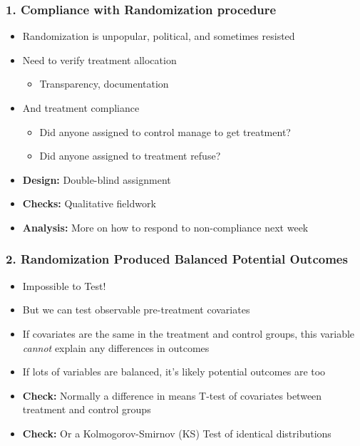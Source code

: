 \documentclass[xcolor=x11names,compress]{beamer}\usepackage[]{graphicx}\usepackage[]{color}
\renewcommand{\(}{\begin{columns}}
\renewcommand{\)}{\end{columns}}
\newcommand{\<}[1]{\begin{column}{#1}}
\renewcommand{\>}{\end{column}}
\begin{document}
\begin{frame}
\frametitle{1. Compliance with Randomization procedure}
\begin{itemize}
\item Randomization is unpopular, political, and sometimes resisted
\pause
\item Need to verify treatment allocation
\begin{itemize}
\item Transparency, documentation
\end{itemize}
\pause
\item And treatment compliance
\begin{itemize}
\item Did anyone assigned to control manage to get treatment?
\item Did anyone assigned to treatment refuse?
\pause
\end{itemize}
\item \textbf{Design:} Double-blind assignment
\pause
\item \textbf{Checks:} Qualitative fieldwork
\pause
\item \textbf{Analysis:} More on how to respond to non-compliance next week
\end{itemize}
\end{frame}

\begin{frame}
\frametitle{2. Randomization Produced Balanced Potential Outcomes}
\begin{itemize}
\item Impossible to Test!
\pause
\item But we can test observable pre-treatment covariates
\pause
\item If covariates are the same in the treatment and control groups, this variable \textit{cannot} explain any differences in outcomes
\pause
\item If lots of variables are balanced, it's likely potential outcomes are too
\pause
\item \textbf{Check:} Normally a difference in means T-test of covariates between treatment and control groups
\pause
\item \textbf{Check:} Or a Kolmogorov-Smirnov (KS) Test of identical distributions
\end{itemize}
\end{frame}
\end{document}
